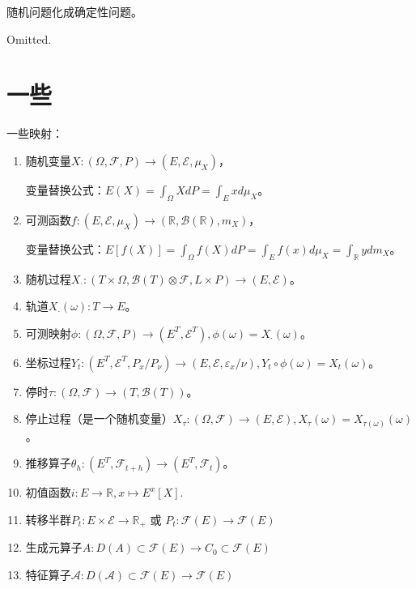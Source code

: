 随机问题化成确定性问题。

Omitted.

\newpage

\section{一些}

一些映射：
\begin{enumerate}[(1).]
  \item 随机变量$X: (\Omega, \mathcal{F}, P) \to (E, \mathcal{E}, \mu_{X})$，
  
  变量替换公式：$E(X) = \int_\Omega X dP = \int_E x d\mu_X$。
  \item 可测函数$f: (E, \mathcal{E}, \mu_X) \to (\mathbb{R}, \mathcal{B}(\mathbb{R}), m_X)$，
  
  变量替换公式：$E[f(X)] = \int_\Omega f(X)dP = \int_E f(x) d\mu_X = \int_\mathbb{R} y dm_X$。
  \item 随机过程$X_{\cdot}: (T \times \Omega, \mathcal{B}(T) \otimes \mathcal{F}, L \times P) \to (E, \mathcal{E})$。
  \item 轨道$X_{\cdot}(\omega): T \to E$。
  \item 可测映射$\phi: (\Omega, \mathcal{F}, P) \to (E^T, \mathcal{E}^T), \phi(\omega) = X_{\cdot}(\omega)$。
  \item 坐标过程$Y_t: (E^T, \mathcal{E}^T, P_x/P_\nu) \to (E, \mathcal{E}, \varepsilon_x/\nu), Y_t \circ \phi (\omega) = X_t(\omega)$。
  \item 停时$\tau: (\Omega, \mathcal{F}) \to (T, \mathcal{B}(T))$。
  \item 停止过程（是一个随机变量）$X_\tau: (\Omega, \mathcal{F}) \to (E, \mathcal{E}), X_\tau (\omega) = X_{\tau(\omega)}(\omega)$。
  \item 推移算子$\theta_h: (E^T, \mathcal{F}_{t + h}) \to (E^T, \mathcal{F}_t)$。
  \item 初值函数$i: E \to \mathbb{R}, x \mapsto E^x[X]$.
  \item 转移半群$P_t: E \times \mathcal{E} \to \mathbb{R}_+$ 或 $P_t: \mathcal{F}(E) \to \mathcal{F}(E)$
  \item 生成元算子$A: D(A) \subset \mathcal{F}(E) \to C_0 \subset \mathcal{F}(E)$
  \item 特征算子$\mathcal{A}: D(\mathcal{A}) \subset \mathcal{F}(E) \to \mathcal{F}(E)$
\end{enumerate}

